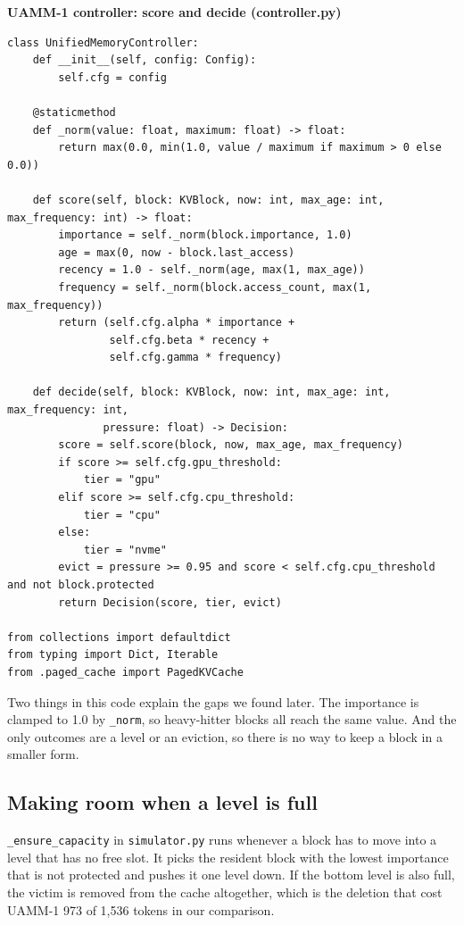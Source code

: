 \documentclass[12pt,a4paper]{report}
\begin{document}
\par\smallskip\noindent\textbf{UAMM-1 controller: score and decide (controller.py)}\par\nopagebreak
\begin{lstlisting}
class UnifiedMemoryController:
    def __init__(self, config: Config):
        self.cfg = config

    @staticmethod
    def _norm(value: float, maximum: float) -> float:
        return max(0.0, min(1.0, value / maximum if maximum > 0 else 0.0))

    def score(self, block: KVBlock, now: int, max_age: int, max_frequency: int) -> float:
        importance = self._norm(block.importance, 1.0)
        age = max(0, now - block.last_access)
        recency = 1.0 - self._norm(age, max(1, max_age))
        frequency = self._norm(block.access_count, max(1, max_frequency))
        return (self.cfg.alpha * importance +
                self.cfg.beta * recency +
                self.cfg.gamma * frequency)

    def decide(self, block: KVBlock, now: int, max_age: int, max_frequency: int,
               pressure: float) -> Decision:
        score = self.score(block, now, max_age, max_frequency)
        if score >= self.cfg.gpu_threshold:
            tier = "gpu"
        elif score >= self.cfg.cpu_threshold:
            tier = "cpu"
        else:
            tier = "nvme"
        evict = pressure >= 0.95 and score < self.cfg.cpu_threshold and not block.protected
        return Decision(score, tier, evict)

from collections import defaultdict
from typing import Dict, Iterable
from .paged_cache import PagedKVCache
\end{lstlisting}
Two things in this code explain the gaps we found later. The importance is clamped to 1.0 by \texttt{\_\allowbreak{}\allowbreak{}norm}, so heavy-hitter blocks all reach the same value. And the only outcomes are a level or an eviction, so there is no way to keep a block in a smaller form.

\subsection{Making room when a level is full}
\texttt{\_\allowbreak{}\allowbreak{}ensure\_\allowbreak{}\allowbreak{}capacity} in \texttt{simulator.\allowbreak{}py} runs whenever a block has to move into a level that has no free slot. It picks the resident block with the lowest importance that is not protected and pushes it one level down. If the bottom level is also full, the victim is removed from the cache altogether, which is the deletion that cost UAMM-1 973 of 1,536 tokens in our comparison.
\end{document}
